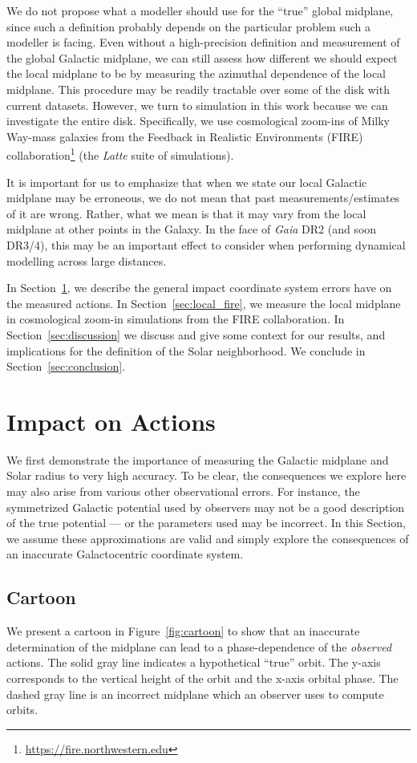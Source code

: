 \documentclass[twocolumn]{aastex62}
\begin{document}
We do not propose what a modeller should use for the ``true'' global midplane,
since such a definition probably depends on the particular problem such a
modeller is facing. Even without a high-precision definition and measurement
of the global Galactic midplane, we can still assess how different we should
expect the local midplane to be by measuring the azimuthal dependence of the
local midplane. This procedure may be readily tractable over some of the disk
with current datasets. However, we turn to simulation in this work because we
can investigate the entire disk. Specifically, we use cosmological zoom-ins of
Milky Way-mass galaxies from the Feedback in Realistic Environments (FIRE)
collaboration\footnote{\url{https://fire.northwestern.edu}} (the {\em Latte}
suite of simulations).

It is important for us to emphasize that when we state our local Galactic
midplane may be erroneous, we do not mean that past measurements/estimates of
it are wrong. Rather, what we mean is that it may vary from the local midplane
at other points in the Galaxy. In the face of {\em Gaia} DR2 (and soon DR3/4),
this may be an important effect to consider when performing dynamical
modelling across large distances.

In Section~\ref{sec:ref_frame}, we describe the general impact coordinate
system errors have on the measured actions. In Section~\ref{sec:local_fire},
we measure the local midplane in cosmological zoom-in simulations from the
FIRE collaboration. In Section~\ref{sec:discussion} we discuss and give some
context for our results, and implications for the definition of the Solar
neighborhood. We conclude in Section~\ref{sec:conclusion}.

\section{Impact on Actions} \label{sec:ref_frame}
We first demonstrate the importance of measuring the Galactic midplane and
Solar radius to very high accuracy. To be clear, the consequences we explore
here may also arise from various other observational errors. For instance, the
symmetrized Galactic potential used by observers may not be a good description
of the true potential --- or the parameters used may be incorrect. In this
Section, we assume these approximations are valid and simply explore the
consequences of an inaccurate Galactocentric coordinate system.

\subsection{Cartoon} \label{ssec:cartoon}
We present a cartoon in Figure~\ref{fig:cartoon} to show that an inaccurate
determination of the midplane can lead to a phase-dependence of the {\em
observed} actions. The solid gray line indicates a hypothetical ``true''
orbit. The y-axis corresponds to the vertical height of the orbit and the
x-axis orbital phase. The dashed gray line is an incorrect midplane which an
observer uses to compute orbits.
\end{document}
